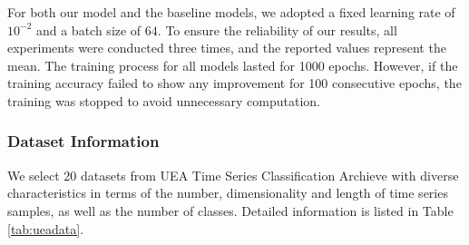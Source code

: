 For both our model and the baseline models, we adopted a fixed learning rate of $10^{-2}$ and a batch size of $64$. To ensure the reliability of our results, all experiments were conducted three times, and the reported values represent the mean. The training process for all models lasted for 1000 epochs. However, if the training accuracy failed to show any improvement for 100 consecutive epochs, the training was stopped to avoid unnecessary computation. 

\subsubsection{Dataset Information}

We select 20 datasets from UEA Time Series Classification Archieve with diverse characteristics in terms of the number, dimensionality and length of time series samples, as well as the number of classes. Detailed information is listed in Table \ref{tab:ueadata}.

\begin{table}[htbp]
    \centering
    \caption{Dataset Information of UEA.}
    \label{tab:ueadata}
\end{table}

